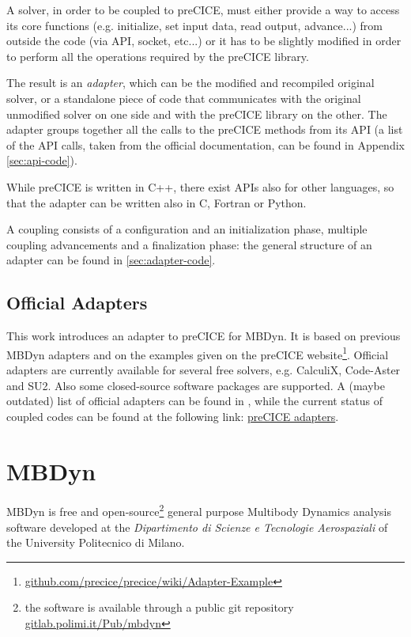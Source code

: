 A solver, in order to be coupled to preCICE, must either provide a way to access its core functions (e.g. initialize, set input data, read output, advance...) from outside the code (via API, socket, etc...) or it has to be slightly modified in order to perform all the operations required by the preCICE library.

The result is an \textit{adapter}, which can be the modified and recompiled original solver, or a standalone piece of code that communicates with the original unmodified solver on one side and with the preCICE library on the other. The adapter groups together all the calls to the preCICE methods from its API (a list of the API calls, taken from the official documentation, can be found in Appendix \ref{sec:api-code}).

While preCICE is written in C++, there exist APIs also for other languages, so that the adapter can be written also in C, Fortran or Python.

A coupling consists of a configuration and an initialization phase, multiple coupling advancements and a finalization phase: the general structure of an adapter can be found in \ref{sec:adapter-code}.


\subsection{Official Adapters}
\label{sec:pc-adapters}


This work introduces an adapter to preCICE for MBDyn. It is based on previous MBDyn adapters and on the examples given on the preCICE website\footnote{\href{https://github.com/precice/precice/wiki/Adapter-Example}{github.com/precice/precice/wiki/Adapter-Example}}.
Official adapters are currently available for several free solvers, e.g. CalculiX, Code-Aster and SU2. Also some closed-source software packages are supported. A (maybe outdated) list of official adapters can be found in \cite{uekermann2017official}, while the current status of coupled codes can be found at the following link: \href{https://www.precice.org/codes/}{preCICE adapters}.


\section{MBDyn}
\label{sec:mbdyn}


MBDyn is free and open-source\footnote{the software is available through a public git repository \href{https://gitlab.polimi.it/Pub/mbdyn}{gitlab.polimi.it/Pub/mbdyn}} general purpose Multibody Dynamics analysis software developed at the \textit{Dipartimento di Scienze e Tecnologie Aerospaziali}  of the University Politecnico di Milano.

